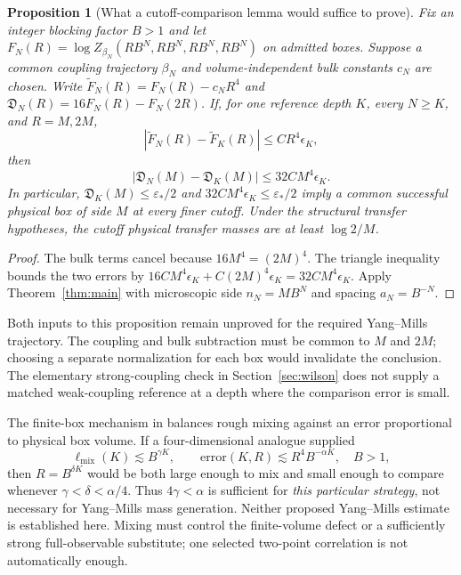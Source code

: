 \documentclass[11pt]{article}
\newtheorem{proposition}[theorem]{Proposition}
\theoremstyle{definition}
\theoremstyle{remark}
\begin{document}
\begin{proposition}[What a cutoff-comparison lemma would suffice to prove]
Fix an integer blocking factor $B>1$ and let
$F_N(R)=\log Z_{\beta_N}(RB^N,RB^N,RB^N,RB^N)$ on admitted boxes.
Suppose a common coupling trajectory $\beta_N$ and volume-independent
bulk constants $c_N$ are chosen. Write
$\widetilde F_N(R)=F_N(R)-c_NR^4$ and
$\mathfrak D_N(R)=16F_N(R)-F_N(2R)$.
If, for one reference depth $K$, every $N\ge K$, and $R=M,2M$,
\[
 |\widetilde F_N(R)-\widetilde F_K(R)|\le C R^4\epsilon_K,
\]
then
\[
 |\mathfrak D_N(M)-\mathfrak D_K(M)|\le32CM^4\epsilon_K.
\]
In particular, $\mathfrak D_K(M)\le\varepsilon_*/2$ and
$32CM^4\epsilon_K\le\varepsilon_*/2$ imply a common successful physical
box of side $M$ at every finer cutoff. Under the structural transfer
hypotheses, the cutoff physical transfer masses are at least $\log2/M$.
\end{proposition}
\begin{proof}
The bulk terms cancel because $16M^4=(2M)^4$.
The triangle inequality bounds the two errors by
$16CM^4\epsilon_K+C(2M)^4\epsilon_K=32CM^4\epsilon_K$.
Apply Theorem~\ref{thm:main} with microscopic side $n_N=MB^N$ and spacing
$a_N=B^{-N}$.
\end{proof}
Both inputs to this proposition remain unproved for the required
Yang--Mills trajectory. The coupling and bulk subtraction must be common
to $M$ and $2M$; choosing a separate normalization for each box would
invalidate the conclusion. The elementary strong-coupling check in
Section~\ref{sec:wilson} does not supply a matched weak-coupling reference
at a depth where the comparison error is small.

The finite-box mechanism in \cite{repo-o3} balances rough mixing against
an error proportional to physical box volume. If a four-dimensional
analogue supplied
\[
 \ell_{\mathrm{mix}}(K)\lesssim B^{\gamma K},\qquad
 \mathrm{error}(K,R)\lesssim R^4 B^{-\alpha K},\quad B>1,
\]
then $R=B^{\delta K}$ would be both large enough to mix and small enough
to compare whenever $\gamma<\delta<\alpha/4$.
Thus $4\gamma<\alpha$ is sufficient for \emph{this particular strategy},
not necessary for Yang--Mills mass generation. Neither proposed
Yang--Mills estimate is established here. Mixing must control the
finite-volume defect or a sufficiently strong full-observable substitute;
one selected two-point correlation is not automatically enough.
\end{document}
